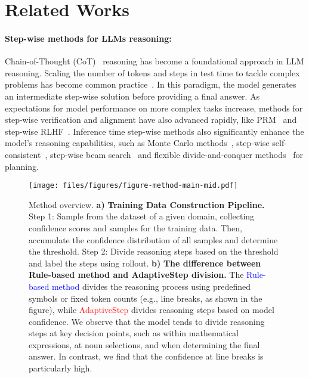 
\section{Related Works}

\paragraph{Step-wise methods for LLMs reasoning: } Chain-of-Thought (CoT)~\cite{wei2023chainofthoughtpromptingelicitsreasoning} reasoning has become a foundational approach in LLM reasoning. Scaling the number of tokens and steps in test time to tackle complex problems has become common practice~\cite{kimiteam2025kimik15scalingreinforcement, deepseekai2025deepseekr1incentivizingreasoningcapability}. In this paradigm, the model generates an intermediate step-wise solution before providing a final answer. As expectations for model performance on more complex tasks increase, methods for step-wise verification and alignment have also advanced rapidly, like PRM~\cite{erprm, wang2024mathshepherdverifyreinforcellms, yuan2024freeprocessrewardsprocess} and step-wise RLHF~\cite{chen2024steplevelvaluepreferenceoptimization, lai2024stepdpostepwisepreferenceoptimization, wang2024cplcriticalplanstep}. Inference time step-wise methods also significantly enhance the model's reasoning capabilities, such as Monte Carlo methods~\cite{feng2023alphazero}, step-wise self-consistent~\cite{zhao2024stepwiseselfconsistentmathematicalreasoning}, step-wise beam search~\cite{lee2024tokensupervisedvaluemodelsenhancing} and flexible divide-and-conquer methods~\cite{yao2023treethoughtsdeliberateproblem, hao2023reasoninglanguagemodelplanning} for planning. 




\begin{figure*}
    \centering
    \texttt{[image: files/figures/figure-method-main-mid.pdf]}
    \caption{Method overview. \textbf{a)} \textbf{\MethodName \hspace{1pt} Training Data Construction Pipeline.} Step 1: Sample from the dataset of a given domain, collecting confidence scores and samples for the training data. Then, accumulate the confidence distribution of all samples and determine the threshold.
    Step 2: Divide reasoning steps based on the threshold and label the steps using rollout. \textbf{b)} \textbf{The difference between Rule-based method and AdaptiveStep division.}
    The \textcolor{blue}{Rule-based method} divides the reasoning process using predefined symbols or fixed token counts (e.g., line breaks, as shown in the figure), while \textcolor{red}{AdaptiveStep} divides reasoning steps based on model confidence.
    We observe that the model tends to divide reasoning steps at key decision points, such as within mathematical expressions, at noun selections, and when determining the final answer. In contrast, we find that the confidence at line breaks is particularly high.
    }
    \label{fig:method_main}
\end{figure*}

